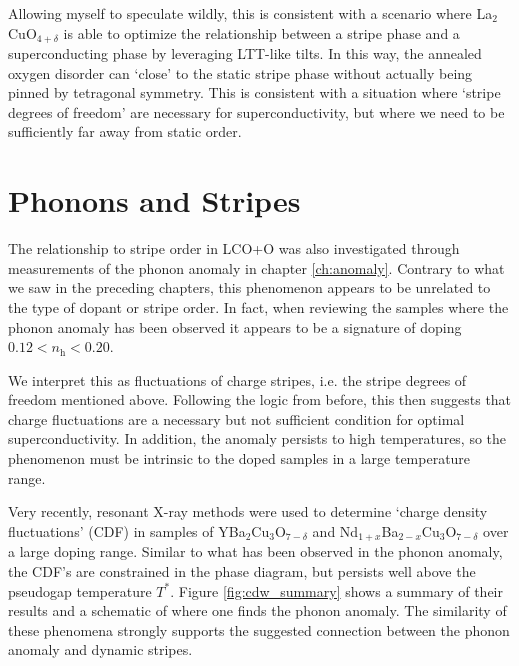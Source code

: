 \noindent Allowing myself to speculate wildly, this is consistent with a scenario where La$_2$CuO$_{4+\delta}$ is able to optimize the relationship between a stripe phase and a superconducting phase by leveraging LTT-like tilts. In this way, the annealed oxygen disorder can `close' to the static stripe phase without actually being pinned by tetragonal symmetry. This is consistent with a situation where `stripe degrees of freedom' are necessary for superconductivity, but where we need to be sufficiently far away from static order.

\section{Phonons and Stripes}
The relationship to stripe order in LCO+O was also investigated through measurements of the phonon anomaly in chapter \ref{ch:anomaly}. Contrary to what we saw in the preceding chapters, this phenomenon appears to be unrelated to the type of dopant or stripe order. In fact, when reviewing the samples where the phonon anomaly has been observed it appears to be a signature of doping $0.12 < n_\text{h} < 0.20$.

We interpret this as fluctuations of charge stripes, i.e. the stripe degrees of freedom mentioned above. Following the logic from before, this then suggests that charge fluctuations are a necessary but not sufficient condition for optimal superconductivity. In addition, the anomaly persists to high temperatures, so the phenomenon must be intrinsic to the doped samples in a large temperature range.

Very recently, resonant X-ray methods were used to determine `charge density fluctuations' (CDF) in samples of YBa$_2$Cu$_3$O$_{7-\delta}$ and Nd$_{1+x}$Ba$_{2-x}$Cu$_3$O$_{7-\delta}$ over a large doping range. Similar to what has been observed in the phonon anomaly, the CDF's are constrained in the phase diagram, but persists well above the pseudogap temperature $T^*$. Figure \ref{fig:cdw_summary} shows a summary of their results and a schematic of where one finds the phonon anomaly. The similarity of these phenomena strongly supports the suggested \cite{Reznik2012} connection between the phonon anomaly and dynamic stripes.

